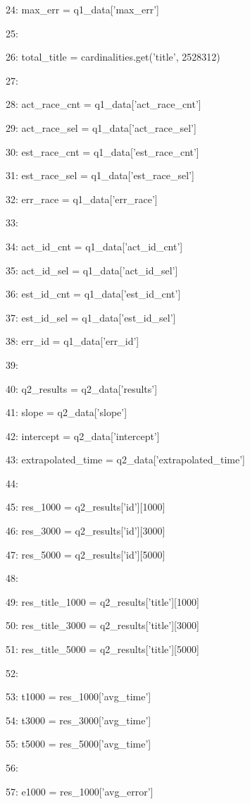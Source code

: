 \documentclass[11pt,a4paper]{article}
\begin{document}
{24:     max\_err = q1\_data['max\_err']

25:

26:     total\_title = cardinalities.get('title', 2528312)

27:

28:     act\_race\_cnt = q1\_data['act\_race\_cnt']

29:     act\_race\_sel = q1\_data['act\_race\_sel']

30:     est\_race\_cnt = q1\_data['est\_race\_cnt']

31:     est\_race\_sel = q1\_data['est\_race\_sel']

32:     err\_race = q1\_data['err\_race']

33:

34:     act\_id\_cnt = q1\_data['act\_id\_cnt']

35:     act\_id\_sel = q1\_data['act\_id\_sel']

36:     est\_id\_cnt = q1\_data['est\_id\_cnt']

37:     est\_id\_sel = q1\_data['est\_id\_sel']

38:     err\_id = q1\_data['err\_id']

39:

40:     q2\_results = q2\_data['results']

41:     slope = q2\_data['slope']

42:     intercept = q2\_data['intercept']

43:     extrapolated\_time = q2\_data['extrapolated\_time']

44:

45:     res\_1000 = q2\_results['id'][1000]

46:     res\_3000 = q2\_results['id'][3000]

47:     res\_5000 = q2\_results['id'][5000]

48:

49:     res\_title\_1000 = q2\_results['title'][1000]

50:     res\_title\_3000 = q2\_results['title'][3000]

51:     res\_title\_5000 = q2\_results['title'][5000]

52:

53:     t1000 = res\_1000['avg\_time']

54:     t3000 = res\_3000['avg\_time']

55:     t5000 = res\_5000['avg\_time']

56:

57:     e1000 = res\_1000['avg\_error']

}
\end{document}
